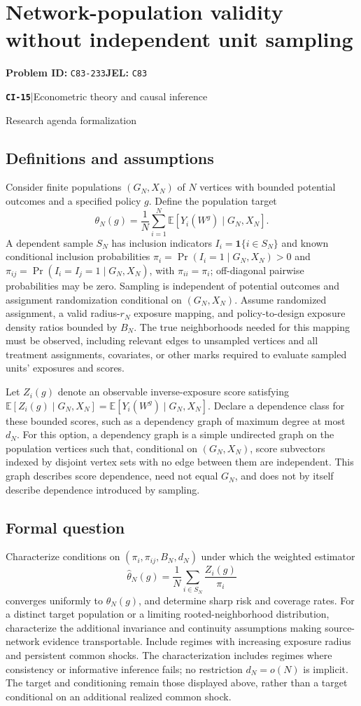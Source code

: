 \documentclass[11pt,a4paper]{article}
\newcommand{\E}{\mathbb E}
\newcommand{\ind}{\mathbf 1}
\newcommand{\entrymeta}[3]{{\sffamily\small\color{muted}\textbf{\texttt{#1}}\quad|\quad #2\par #3\par}}
\begin{document}
\section*{Network-population validity without independent unit sampling}
\textbf{Problem ID:} \texttt{C83-233}\quad \textbf{JEL:} \texttt{C83}\par
\label{problem:OP-0494}
\label{beyond:CI-15}
\entrymeta{CI-15}{Econometric theory and causal inference}{Research agenda formalization}
\subsection*{Definitions and assumptions}
Consider finite populations $(G_N,X_N)$ of $N$ vertices with bounded potential outcomes and a specified policy $g$. Define the population target
\[
\theta_N(g)=\frac1N\sum_{i=1}^N
 \E[Y_i(W^g)\mid G_N,X_N].
\]
A dependent sample $S_N$ has inclusion indicators $I_i=\ind\{i\in S_N\}$ and known conditional inclusion probabilities $\pi_i=\Pr(I_i=1\mid G_N,X_N)>0$ and $\pi_{ij}=\Pr(I_i=I_j=1\mid G_N,X_N)$, with $\pi_{ii}=\pi_i$; off-diagonal pairwise probabilities may be zero. Sampling is independent of potential outcomes and assignment randomization conditional on $(G_N,X_N)$. Assume randomized assignment, a valid radius-$r_N$ exposure mapping, and policy-to-design exposure density ratios bounded by $B_N$. The true neighborhoods needed for this mapping must be observed, including relevant edges to unsampled vertices and all treatment assignments, covariates, or other marks required to evaluate sampled units' exposures and scores.

Let $Z_i(g)$ denote an observable inverse-exposure score satisfying
$\E[Z_i(g)\mid G_N,X_N]=\E[Y_i(W^g)\mid G_N,X_N]$.
Declare a dependence class for these bounded scores, such as a dependency graph of maximum degree at most $d_N$. For this option, a dependency graph is a simple undirected graph on the population vertices such that, conditional on $(G_N,X_N)$, score subvectors indexed by disjoint vertex sets with no edge between them are independent. This graph describes score dependence, need not equal $G_N$, and does not by itself describe dependence introduced by sampling.
\subsection*{Formal question}
Characterize conditions on $(\pi_i,\pi_{ij},B_N,d_N)$ under which the weighted estimator
\[
 \widehat\theta_N(g)=\frac1N\sum_{i\in S_N}\frac{Z_i(g)}{\pi_i}
\]
converges uniformly to $\theta_N(g)$, and determine sharp risk and coverage rates. For a distinct target population or a limiting rooted-neighborhood distribution, characterize the additional invariance and continuity assumptions making source-network evidence transportable. Include regimes with increasing exposure radius and persistent common shocks. The characterization includes regimes where consistency or informative inference fails; no restriction $d_N=o(N)$ is implicit. The target and conditioning remain those displayed above, rather than a target conditional on an additional realized common shock.
\end{document}
